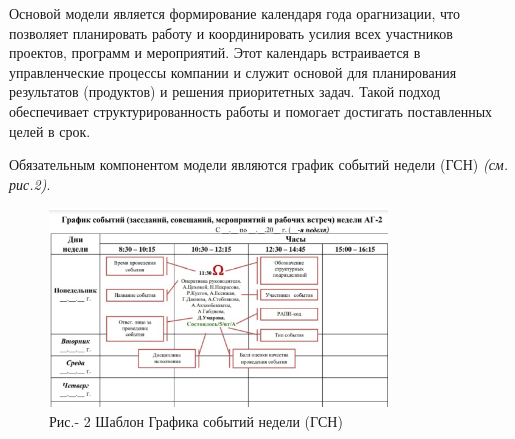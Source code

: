 \begin{multicols}{2}
Основой модели является формирование календаря года орагнизации, что
позволяет планировать работу и координировать усилия всех участников
проектов, программ и мероприятий. Этот календарь встраивается в
управленческие процессы компании и служит основой для планирования
результатов (продуктов) и решения приоритетных задач. Такой подход
обеспечивает структурированность работы и помогает достигать
поставленных целей в срок.

Обязательным компонентом модели являются график событий недели (ГСН)
\emph{(см. рис.2)}.
\end{multicols}

\begin{figure}[H]
	\centering
	\includegraphics[width=0.8\textwidth]{media/ekon/image2}
	\caption*{Рис.- 2 Шаблон Графика событий недели (ГСН)}
\end{figure}

